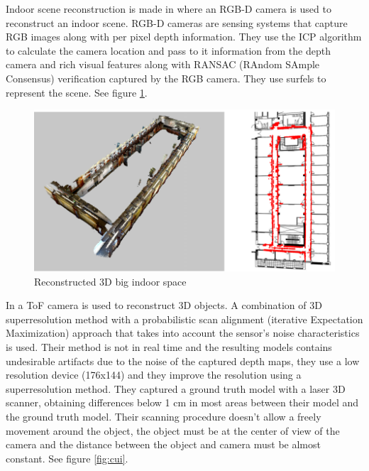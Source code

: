  Indoor scene reconstruction is made in \cite{henry} where an RGB-D camera is used to reconstruct an indoor scene. RGB-D cameras are sensing systems that capture RGB images
 along with per pixel depth information. They use the ICP algorithm to calculate the camera location and pass to it information from 
the depth camera and  rich visual
 features along with RANSAC (RAndom SAmple Consensus) verification captured by the RGB camera. They use surfels \cite{pfister} to represent the scene. See figure \ref{fig:henry}.

\begin{figure}[h!]
\begin{center}
\includegraphics[scale=0.29]{images/henry}
\caption{Reconstructed 3D big indoor space}
\label{fig:henry}
\end{center}
\end{figure}

In \cite{cui} a ToF camera is used to reconstruct 3D objects. A combination of 3D superresolution method with a 
probabilistic scan alignment (iterative Expectation Maximization) approach that takes into account the sensor's 
noise characteristics is used. Their method is not in real time and the resulting models contains undesirable 
artifacts due to  the noise of the captured depth maps, they use a low resolution device (176x144) and they 
improve the resolution using a superresolution method. They captured a ground truth model with a laser 3D scanner, 
obtaining differences below 1 cm in most areas between their model and the ground truth model. Their scanning 
procedure doesn't allow a freely movement around the object, the object must be at the center of view of the camera 
and the distance between the object and camera must be almost constant. See figure \ref{fig:cui}.

